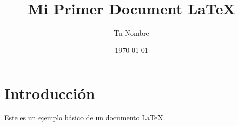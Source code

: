 \documentclass{article}
\title{Mi Primer Document LaTeX}
\author{Tu Nombre}
\date{\today}
\begin{document}
	
	\maketitle
	
	\section{Introducción}
	Este es un ejemplo básico de un documento LaTeX.
	
\end{document}
